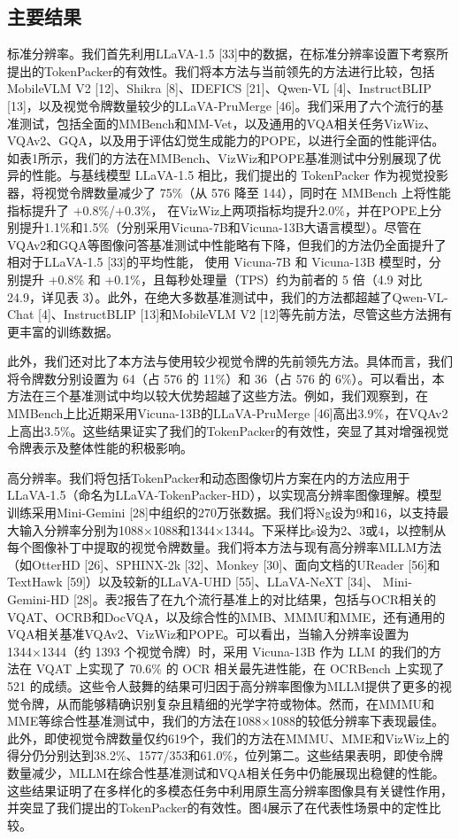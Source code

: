 \subsection{主要结果}

标准分辨率。我们首先利用LLaVA-1.5 [33]中的数据，在标准分辨率设置下考察所提出的TokenPacker的有效性。我们将本方法与当前领先的方法进行比较，包括MobileVLM V2 [12]、Shikra [8]、IDEFICS [21]、Qwen-VL [4]、InstructBLIP [13]，以及视觉令牌数量较少的LLaVA-PruMerge [46]。我们采用了六个流行的基准测试，包括全面的MMBench和MM-Vet，以及通用的VQA相关任务VizWiz、VQAv2、GQA，以及用于评估幻觉生成能力的POPE，以进行全面的性能评估。如表1所示，我们的方法在MMBench、VizWiz和POPE基准测试中分别展现了优异的性能。与基线模型 LLaVA-1.5 相比，我们提出的 TokenPacker 作为视觉投影器，将视觉令牌数量减少了 75\%（从 576 降至 144），同时在 MMBench 上将性能指标提升了 +0.8\%/+0.3\%， 在VizWiz上两项指标均提升2.0\%，并在POPE上分别提升1.1\%和1.5\%（分别采用Vicuna-7B和Vicuna-13B大语言模型）。尽管在VQAv2和GQA等图像问答基准测试中性能略有下降，但我们的方法仍全面提升了相对于LLaVA-1.5 [33]的平均性能， 使用 Vicuna-7B 和 Vicuna-13B 模型时，分别提升 +0.8\% 和 +0.1\%，且每秒处理量（TPS）约为前者的 5 倍（4.9 对比 24.9，详见表 3）。此外，在绝大多数基准测试中，我们的方法都超越了Qwen-VL-Chat [4]、InstructBLIP [13]和MobileVLM V2 [12]等先前方法，尽管这些方法拥有更丰富的训练数据。

此外，我们还对比了本方法与使用较少视觉令牌的先前领先方法。具体而言，我们将令牌数分别设置为 64（占 576 的 11\%）和 36（占 576 的 6\%）。可以看出，本方法在三个基准测试中均以较大优势超越了这些方法。例如，我们观察到，在MMBench上比近期采用Vicuna-13B的LLaVA-PruMerge [46]高出3.9\%，在VQAv2上高出3.5\%。这些结果证实了我们的TokenPacker的有效性，突显了其对增强视觉令牌表示及整体性能的积极影响。

高分辨率。我们将包括TokenPacker和动态图像切片方案在内的方法应用于LLaVA-1.5（命名为LLaVA-TokenPacker-HD），以实现高分辨率图像理解。模型训练采用Mini-Gemini [28]中组织的270万张数据。我们将Ng设为9和16，以支持最大输入分辨率分别为1088×1088和1344×1344。下采样比s设为2、3或4，以控制从每个图像补丁中提取的视觉令牌数量。我们将本方法与现有高分辨率MLLM方法（如OtterHD [26]、SPHINX-2k [32]、Monkey [30]、面向文档的UReader [56]和TextHawk [59]）以及较新的LLaVA-UHD [55]、LLaVA-NeXT [34]、 Mini-Gemini-HD [28]。表2报告了在九个流行基准上的对比结果，包括与OCR相关的VQAT、OCRB和DocVQA，以及综合性的MMB、MMMU和MME，还有通用的VQA相关基准VQAv2、VizWiz和POPE。可以看出，当输入分辨率设置为 1344×1344（约 1393 个视觉令牌）时，采用 Vicuna-13B 作为 LLM 的我们的方法在 VQAT 上实现了 70.6\% 的 OCR 相关最先进性能，在 OCRBench 上实现了 521 的成绩。这些令人鼓舞的结果可归因于高分辨率图像为MLLM提供了更多的视觉令牌，从而能够精确识别复杂且精细的光学字符或物体。然而，在MMMU和MME等综合性基准测试中，我们的方法在1088×1088的较低分辨率下表现最佳。此外，即使视觉令牌数量仅约619个，我们的方法在MMMU、MME和VizWiz上的得分仍分别达到38.2\%、1577/353和61.0\%，位列第二。这些结果表明，即使令牌数量减少，MLLM在综合性基准测试和VQA相关任务中仍能展现出稳健的性能。这些结果证明了在多样化的多模态任务中利用原生高分辨率图像具有关键性作用，并突显了我们提出的TokenPacker的有效性。图4展示了在代表性场景中的定性比较。


